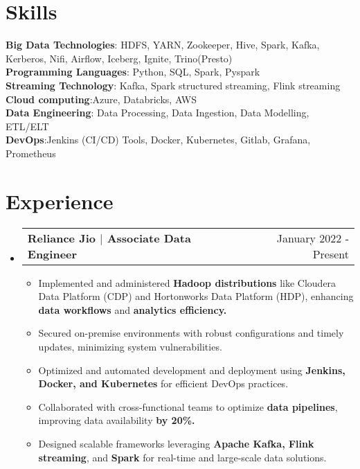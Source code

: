 \documentclass[letterpaper,10pt]{article}
\makeatletter
\newcommand{\resumeItem}[1]{
    \item\small{
      {#1 \vspace{-2pt}}
    }
  }
\newcommand{\resumeSubheading}[4]{
    \vspace{-2pt}\item
      \begin{tabular*}{0.97\textwidth}[t]{l@{\extracolsep{\fill}}r}
        \textbf{#1} & #2 \\
      \end{tabular*}\vspace{-7pt}
  }
\newcommand{\resumeSubHeadingListStart}{\begin{itemize}[leftmargin=0.15in, label={}]}
\newcommand{\resumeSubHeadingListEnd}{\end{itemize}}
\newcommand{\resumeItemListStart}{\begin{itemize}}
\newcommand{\resumeItemListEnd}{\end{itemize}\vspace{-5pt}}
\makeatother
\begin{document}
  \section{Skills}
   \begin{itemize}[leftmargin=0.15in, label={}]
      \small{\item{
       \textbf{Big Data Technologies}{:\hspace{0.49cm}     HDFS, YARN, Zookeeper, Hive, Spark, Kafka, Kerberos, Nifi, Airflow, Iceberg, Ignite, Trino(Presto)    } \\
       \textbf{Programming Languages}{:\hspace{0.09cm}   Python, SQL, Spark, Pyspark} \\
       \textbf{Streaming Technology}{:\hspace{0.51cm} Kafka, Spark structured streaming, Flink streaming} \\
       \textbf{Cloud computing}{:\hspace{1.45cm}Azure, Databricks, AWS } \\
       \textbf{Data Engineering}{:\hspace{1.25cm} Data Processing, Data Ingestion, Data Modelling, ETL/ELT }\\
       \textbf{DevOps}{:\hspace{2.98cm}Jenkins (CI/CD) Tools, Docker, Kubernetes, Gitlab, Grafana, Prometheus} \\
       
       
      }}
   \end{itemize}




  \section{Experience}
    \resumeSubHeadingListStart
      \resumeSubheading
        {Reliance Jio $|$ Associate Data Engineer }{January 2022 - Present}
        {Associate Data Engineer}{Navi Mumbai, India}
        \resumeItemListStart
        \resumeItem{Implemented and administered \textbf{Hadoop distributions} like Cloudera Data Platform (CDP) and Hortonworks Data Platform (HDP), enhancing \textbf{data workflows} and \textbf{analytics efficiency.}}
        \resumeItem{Secured on-premise environments with robust configurations and timely updates, minimizing system vulnerabilities.}
        \resumeItem{Optimized and automated development and deployment using \textbf{Jenkins, Docker, and Kubernetes} for efficient DevOps practices. }
        \resumeItem{Collaborated with cross-functional teams to optimize \textbf{data pipelines}, improving data availability \textbf{by 20\%.} }
        \resumeItem{Designed scalable frameworks leveraging \textbf{Apache Kafka, Flink streaming}, and \textbf{Spark} for real-time and large-scale data solutions.}
      \resumeItemListEnd     
    \resumeSubHeadingListEnd
\end{document}

